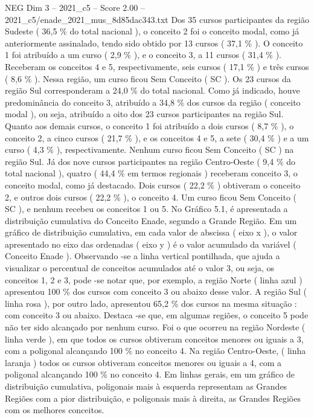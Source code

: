 \begin{textsample}{NEG Dim 3 – 2021\_c5 – Score 2.00 – 2021\_c5/enade\_2021\_mus\_8d85dac343.txt}
Dos 35 cursos participantes da região Sudeste ( 36,5 \% do total nacional ), o conceito 2 foi o conceito modal, como já anteriormente assinalado, tendo sido obtido por 13 cursos ( 37,1 \% ).
O conceito 1 foi atribuído a um curso ( 2,9 \% ), e o conceito 3, a 11 cursos ( 31,4 \% ).
Receberam os conceitos 4 e 5, respectivamente, seis cursos ( 17,1 \% ) e três cursos ( 8,6 \% ).
Nessa região, um curso ficou Sem Conceito ( SC ).
Os 23 cursos da região Sul corresponderam a 24,0 \% do total nacional.
Como já indicado, houve predominância do conceito 3, atribuído a 34,8 \% dos cursos da região ( conceito modal ), ou seja, atribuído a oito dos 23 cursos participantes na região Sul.
Quanto aos demais cursos, o conceito 1 foi atribuído a dois cursos ( 8,7 \% ), o conceito 2, a cinco cursos ( 21,7 \% ), e os conceitos 4 e 5, a sete ( 30,4 \% ) e a um curso ( 4,3 \% ), respectivamente.
Nenhum curso ficou Sem Conceito ( SC ) na região Sul.
Já dos nove cursos participantes na região Centro-Oeste ( 9,4 \% do total nacional ), quatro ( 44,4 \% em termos regionais ) receberam conceito 3, o conceito modal, como já destacado.
Dois cursos ( 22,2 \% ) obtiveram o conceito 2, e outros dois cursos ( 22,2 \% ), o conceito 4.
Um curso ficou Sem Conceito ( SC ), e nenhum recebeu os conceitos 1 ou 5.
No Gráfico 5.1, é apresentada a distribuição cumulativa do Conceito Enade, segundo a Grande Região.
Em um gráfico de distribuição cumulativa, em cada valor de abscissa ( eixo x ), o valor apresentado no eixo das ordenadas ( eixo y ) é o valor acumulado da variável ( Conceito Enade ).
Observando -se a linha vertical pontilhada, que ajuda a visualizar o percentual de conceitos acumulados até o valor 3, ou seja, os conceitos 1, 2 e 3, pode -se notar que, por exemplo, a região Norte ( linha azul ) apresentou 100 \% dos cursos com conceito 3 ou abaixo desse valor.
A região Sul ( linha rosa ), por outro lado, apresentou 65,2 \% dos cursos na mesma situação : com conceito 3 ou abaixo.
Destaca -se que, em algumas regiões, o conceito 5 pode não ter sido alcançado por nenhum curso.
Foi o que ocorreu na região Nordeste ( linha verde ), em que todos os cursos obtiveram conceitos menores ou iguais a 3, com a poligonal alcançando 100 \% no conceito 4.
Na região Centro-Oeste, ( linha laranja ) todos os cursos obtiveram conceitos menores ou iguais a 4, com a poligonal alcançando 100 \% no conceito 4.
Em linhas gerais, em um gráfico de distribuição cumulativa, poligonais mais à esquerda representam as Grandes Regiões com a pior distribuição, e poligonais mais à direita, as Grandes Regiões com os melhores conceitos.

\end{textsample}
